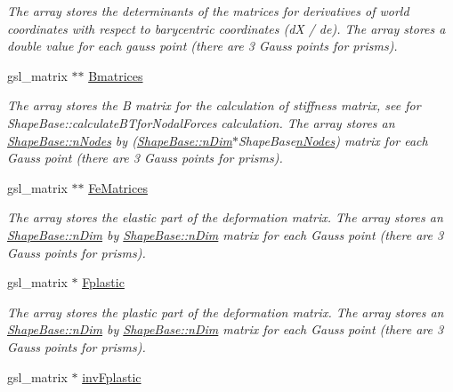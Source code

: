 \begin{DoxyCompactItemize}
\begin{DoxyCompactList}\small\item\em The array stores the determinants of the matrices for derivatives of world coordinates with respect to barycentric coordinates (d\+X / de). The array stores a double value for each gauss point (there are 3 Gauss points for prisms). \end{DoxyCompactList}\item 
\hypertarget{classShapeBase_ace860a66508f503be2a46c351a9358c3}{}gsl\+\_\+matrix $\ast$$\ast$ \hyperlink{classShapeBase_ace860a66508f503be2a46c351a9358c3}{Bmatrices}\label{classShapeBase_ace860a66508f503be2a46c351a9358c3}

\begin{DoxyCompactList}\small\item\em The array stores the B matrix for the calculation of stiffness matrix, see for Shape\+Base\+::calculate\+B\+Tfor\+Nodal\+Forces calculation. The array stores an \hyperlink{classShapeBase_ae7dd93b58b3281ce90025f83d0f0e976}{Shape\+Base\+::n\+Nodes} by (\hyperlink{classShapeBase_a250bd3396546342c8104f5b9c180d18f}{Shape\+Base\+::n\+Dim}$\ast$\+Shape\+Base\hyperlink{classShapeBase_ae7dd93b58b3281ce90025f83d0f0e976}{n\+Nodes}) matrix for each Gauss point (there are 3 Gauss points for prisms). \end{DoxyCompactList}\item 
\hypertarget{classShapeBase_ac3259f3f52ab4d7a514ea987012a6bd6}{}gsl\+\_\+matrix $\ast$$\ast$ \hyperlink{classShapeBase_ac3259f3f52ab4d7a514ea987012a6bd6}{Fe\+Matrices}\label{classShapeBase_ac3259f3f52ab4d7a514ea987012a6bd6}

\begin{DoxyCompactList}\small\item\em The array stores the elastic part of the deformation matrix. The array stores an \hyperlink{classShapeBase_a250bd3396546342c8104f5b9c180d18f}{Shape\+Base\+::n\+Dim} by \hyperlink{classShapeBase_a250bd3396546342c8104f5b9c180d18f}{Shape\+Base\+::n\+Dim} matrix for each Gauss point (there are 3 Gauss points for prisms). \end{DoxyCompactList}\item 
\hypertarget{classShapeBase_aa0dbfe70da6938be7304934d80cb0ddf}{}gsl\+\_\+matrix $\ast$ \hyperlink{classShapeBase_aa0dbfe70da6938be7304934d80cb0ddf}{Fplastic}\label{classShapeBase_aa0dbfe70da6938be7304934d80cb0ddf}

\begin{DoxyCompactList}\small\item\em The array stores the plastic part of the deformation matrix. The array stores an \hyperlink{classShapeBase_a250bd3396546342c8104f5b9c180d18f}{Shape\+Base\+::n\+Dim} by \hyperlink{classShapeBase_a250bd3396546342c8104f5b9c180d18f}{Shape\+Base\+::n\+Dim} matrix for each Gauss point (there are 3 Gauss points for prisms). \end{DoxyCompactList}\item 
\hypertarget{classShapeBase_aaa49d057ee26d805da5befa72c9bbf58}{}gsl\+\_\+matrix $\ast$ \hyperlink{classShapeBase_aaa49d057ee26d805da5befa72c9bbf58}{inv\+Fplastic}\label{classShapeBase_aaa49d057ee26d805da5befa72c9bbf58}


\end{DoxyCompactItemize}
